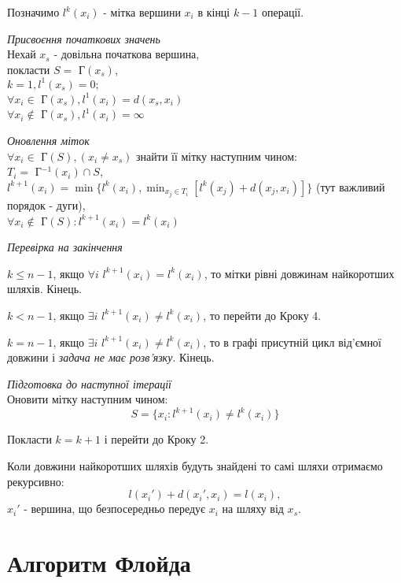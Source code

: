 \documentclass[12pt,a4paper]{book}
\newenvironment{slim_enumerate}{
\begin{enumerate}
  \setlength{\itemsep}{1pt}
  \setlength{\parskip}{0pt}
  \setlength{\parsep}{0pt}}
{\end{enumerate}}
\begin{document}
Позначимо $l^k(x_i)$ - мітка вершини $x_i$ в кінці $k-1$ операції.
\begin{slim_enumerate}
  \item \emph{Присвоєння початкових значень}\\
Нехай $x_s$ - довільна початкова вершина,\\
покласти $S=$ Г$(x_s)$,\\
$k=1, l^1(x_s)=0;$\\
$\forall x_i \in$ Г$(x_s), l^1(x_i)=d(x_s,x_i)$\\
$\forall x_i \notin$ Г$(x_s), l^1(x_i)=\infty$
  \item \emph{Оновлення міток}\\
$\forall x_i \in$ Г$(S), (x_i \neq x_s)$ знайти її мітку наступним чином:\\
$T_i=$ Г$^{-1}(x_i) \cap S$,\\
$l^{k+1}(x_i)=\min\{l^k(x_i),\displaystyle\min_{x_j \in T_i}[l^k(x_j)+d(x_j,x_i)]\}$ (тут важливий порядок - дуги),\\
$\forall x_i \notin$ Г$(S): l^{k+1}(x_i)=l^k(x_i)$
  \item \emph{Перевірка на закінчення}
    \begin{slim_enumerate}
      \item $k \leq n-1$, якщо $\forall i$ $l^{k+1}(x_i)=l^k(x_i)$, то мітки рівні довжинам найкоротших шляхів. Кінець.
      \item $k<n-1$, якщо $\exists i$ $l^{k+1}(x_i) \neq l^k(x_i)$, то перейти до Кроку 4.
      \item $k=n-1$, якщо $\exists i$ $l^{k+1}(x_i) \neq l^k(x_i)$, то в графі присутній цикл від’ємної довжини і \emph{задача не має розв’язку}. Кінець.
    \end{slim_enumerate}
  \item \emph{Підготовка до наступної ітерації}\\
Оновити мітку наступним чином:
$$S=\{x_i:l^{k+1}(x_i) \neq l^k(x_i)\}$$
  \item Покласти $k=k+1$ і перейти до Кроку 2.
\end{slim_enumerate}

Коли довжини найкоротших шляхів будуть знайдені то самі шляхи отримаємо рекурсивно:
$$l(x_i')+d(x_i',x_i)=l(x_i),$$
$x_i'$ - вершина, що безпосередньо передує $x_i$ на шляху від $x_s$.

\section{Алгоритм Флойда}
\end{document}
